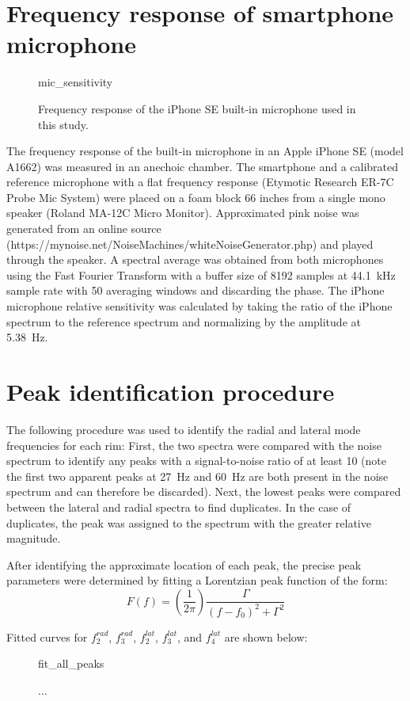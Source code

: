 \documentclass[../../thesis.tex]{subfiles}
\begin{document}
\section{Frequency response of smartphone microphone}
\label{app:mic_cal}

\begin{figure}[h]
\centering
{mic_sensitivity}
\caption{Frequency response of the iPhone SE built-in microphone used in this study.}
\label{fig:mic_sensitivity}
\end{figure}

The frequency response of the built-in microphone in an Apple iPhone SE (model A1662) was measured in an anechoic chamber. The smartphone and a calibrated reference microphone with a flat frequency response (Etymotic Research ER-7C Probe Mic System) were placed on a foam block 66 inches from a single mono speaker (Roland MA-12C Micro Monitor). Approximated pink noise was generated from an online source (https://mynoise.net/NoiseMachines/whiteNoiseGenerator.php) and played through the speaker. A spectral average was obtained from both microphones using the Fast Fourier Transform with a buffer size of 8192 samples at \SI{44.1}{kHz} sample rate with 50 averaging windows and discarding the phase. The iPhone microphone relative sensitivity was calculated by taking the ratio of the iPhone spectrum to the reference spectrum and normalizing by the amplitude at \SI{5.38}{Hz}.

\section{Peak identification procedure}
\label{app:peak_fits}

The following procedure was used to identify the radial and lateral mode frequencies for each rim: First, the two spectra were compared with the noise spectrum to identify any peaks with a signal-to-noise ratio of at least 10 (note the first two apparent peaks at \SI{27}{Hz} and \SI{60}{Hz} are both present in the noise spectrum and can therefore be discarded). Next, the lowest peaks were compared between the lateral and radial spectra to find duplicates. In the case of duplicates, the peak was assigned to the spectrum with the greater relative magnitude.

After identifying the approximate location of each peak, the precise peak parameters were determined by fitting a Lorentzian peak function of the form:
\begin{equation}
\label{eq:ema_peak_fit}
F(f) = \left(\frac{1}{2\pi}\right) \frac{\Gamma}{(f-f_0)^2 + \Gamma^2}
\end{equation}

Fitted curves for $f_2^{rad}$, $f_3^{rad}$, $f_2^{lat}$, $f_3^{lat}$, and $f_4^{lat}$ are shown below:

\begin{figure}
\centering
{fit_all_peaks}
\caption{...}
\label{fig:ema_all_peaks}
\end{figure}
\end{document}
